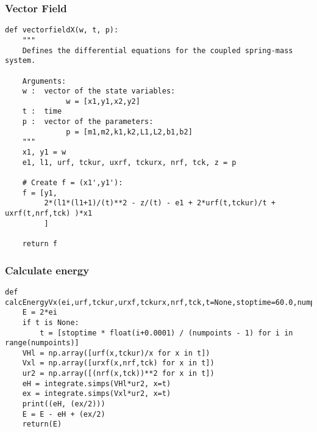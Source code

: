\documentclass[11pt,a4paper]{article}
\begin{document}
\subsubsection{Vector Field}
\label{sec:org6071ef3}
\begin{verbatim}
def vectorfieldX(w, t, p):
    """
    Defines the differential equations for the coupled spring-mass system.

    Arguments:
    w :  vector of the state variables:
              w = [x1,y1,x2,y2]
    t :  time
    p :  vector of the parameters:
              p = [m1,m2,k1,k2,L1,L2,b1,b2]
    """
    x1, y1 = w
    e1, l1, urf, tckur, uxrf, tckurx, nrf, tck, z = p

    # Create f = (x1',y1'):
    f = [y1,
         2*(l1*(l1+1)/(t)**2 - z/(t) - e1 + 2*urf(t,tckur)/t + uxrf(t,nrf,tck) )*x1
         ]

    return f
\end{verbatim}
\subsubsection{Calculate energy}
\label{sec:org5ac077e}
\begin{verbatim}
def calcEnergyVx(ei,urf,tckur,urxf,tckurx,nrf,tck,t=None,stoptime=60.0,numpoints=3200):
    E = 2*ei
    if t is None:
        t = [stoptime * float(i+0.0001) / (numpoints - 1) for i in range(numpoints)]
    VHl = np.array([urf(x,tckur)/x for x in t])
    Vxl = np.array([urxf(x,nrf,tck) for x in t])
    ur2 = np.array([(nrf(x,tck))**2 for x in t])
    eH = integrate.simps(VHl*ur2, x=t)
    ex = integrate.simps(Vxl*ur2, x=t)
    print((eH, (ex/2)))
    E = E - eH + (ex/2)
    return(E)
\end{verbatim}
\end{document}
